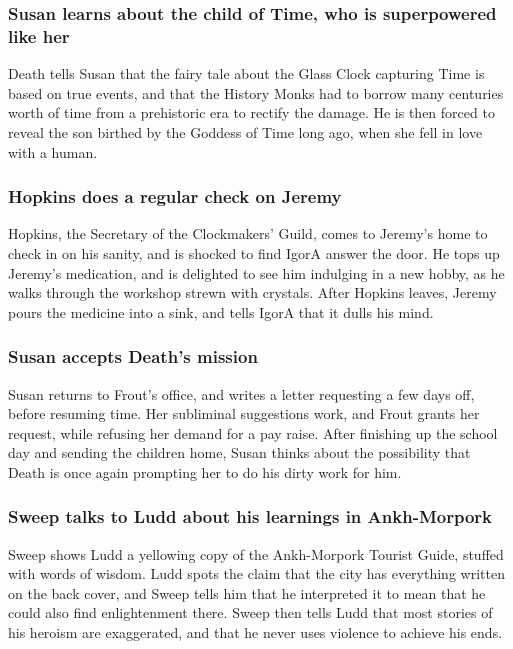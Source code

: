 \subsubsection{\Gls{Susan} learns about the child of \Gls{Time}, who is superpowered like her}
\Gls{Death} tells \Gls{Susan} that the fairy tale about the Glass Clock capturing \Gls{Time} is
based on true events, and that the History Monks had to borrow many centuries worth of time from a
prehistoric era to rectify the damage. He is then forced to reveal the son birthed by the Goddess
of \Gls{Time} long ago, when she fell in love with a human.

\subsubsection{\Gls{Hopkins} does a regular check on \Gls{Jeremy}}
\Gls{Hopkins}, the Secretary of the Clockmakers' Guild, comes to \Gls{Jeremy}'s home to check in
on his sanity, and is shocked to find \Gls{IgorA} answer the door. He tops up \Gls{Jeremy}'s
medication, and is delighted to see him indulging in a new hobby, as he walks through the workshop
strewn with crystals. After \Gls{Hopkins} leaves, \Gls{Jeremy} pours the medicine into a sink, and
tells \Gls{IgorA} that it dulls his mind.

\subsubsection{\Gls{Susan} accepts \Gls{Death}'s mission}
\Gls{Susan} returns to \Gls{Frout}'s office, and writes a letter requesting a few days off, before
resuming time. Her subliminal suggestions work, and \Gls{Frout} grants her request, while refusing
her demand for a pay raise. After finishing up the school day and sending the children home,
\Gls{Susan} thinks about the possibility that \Gls{Death} is once again prompting her to do his
dirty work for him.

\subsubsection{\Gls{Sweep} talks to \Gls{Ludd} about his learnings in Ankh-Morpork}
\Gls{Sweep} shows \Gls{Ludd} a yellowing copy of the Ankh-Morpork Tourist Guide, stuffed with
words of wisdom. \Gls{Ludd} spots the claim that the city has everything written on the back cover,
and \Gls{Sweep} tells him that he interpreted it to mean that he could also find enlightenment
there. \Gls{Sweep} then tells \Gls{Ludd} that most stories of his heroism are exaggerated, and that
he never uses violence to achieve his ends.

